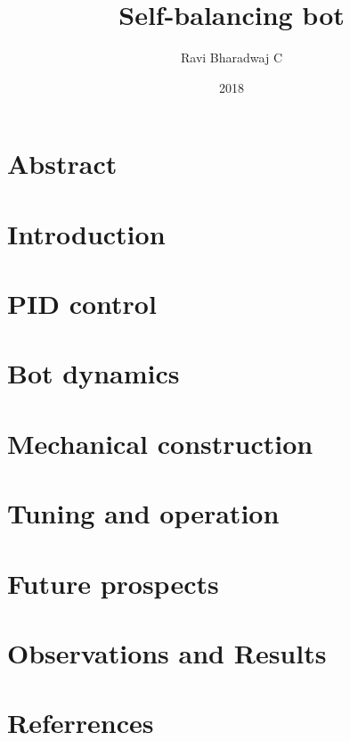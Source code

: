 \documentclass[12pt, oneside]{report}
\title{Self-balancing bot}
\author{Ravi Bharadwaj C}
\date{2018}
\begin{document}


\chapter*{Abstract}


\cleardoublepage

\tableofcontents


\listoffigures
\thispagestyle{empty}

\chapter{Introduction}


\chapter{PID control}


\chapter{Bot dynamics}


\chapter{Mechanical construction}


\chapter{Tuning and operation}


\chapter{Future prospects}


\chapter{Observations and Results}


% 
% 
\chapter{Referrences}


%
\end{document}

